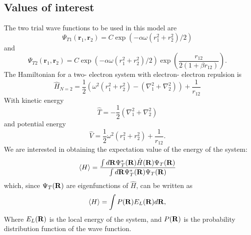 \documentclass[10pt,a4paper]{article}
\begin{document}
\subsection{Values of interest}
The two trial wave functions to be used in this model are 
\begin{equation}
\Psi_{T1}(\mathbf{r}_1,\mathbf{r}_2) = C\exp{\left(-\alpha\omega(r_1^2+r_2^2)/2\right)}
\end{equation}
and
\begin{equation}
\Psi_{T2}(\mathbf{r}_1,\mathbf{r}_2) =
    C\exp{\left(-\alpha\omega(r_1^2+r_2^2)/2\right)}
    \exp{\left(\frac{r_{12}}{2(1+\beta r_{12})}\right)}.
\end{equation}
The Hamiltonian for a two- electron system with electron- electron repulsion is
\begin{equation}
\hat{H}_{N=2} = \frac{1}{2}\left( \omega^2   \left( r_1^2+r_2^2 \right)-\left( \nabla_1^2 + \nabla_2^2 \right)  \right)+\frac{1}{r_{12}}
\end{equation}
With kinetic energy 
\begin{equation}
\hat{T} = - \frac{1}{2}\left( \nabla_1^2 + \nabla_2^2 \right) 
\end{equation}
and potential energy 
\begin{equation}
\hat{V}=  \frac{1}{2} \omega^2   \left( r_1^2+r_2^2 \right) +\frac{1}{r_{12}}.
\end{equation}
We are interested in obtaining the expectation value of the energy of the system:
\begin{equation}
\langle H \rangle = \frac{\int d{\bf
R}\Psi^{\ast}_T({\bf R})\hat{H}({\bf R})\Psi_T({\bf R})}
{\int d{\bf
R}\Psi^{\ast}_T({\bf R})\Psi_T({\bf R})}
\end{equation}
which, since $\Psi_T({\bf R})$ are eigenfunctions of $\hat{H}$, can be written as 
\begin{equation}\label{Energy_expectation_value}
\langle H \rangle =\int P({\bf R})E_L({\bf R})d{\bf R},
\end{equation}
Where $E_L({\bf R})$ is the local energy of the system, and $P({\bf R})$ is the probability distribution function of the wave function.
\end{document}
